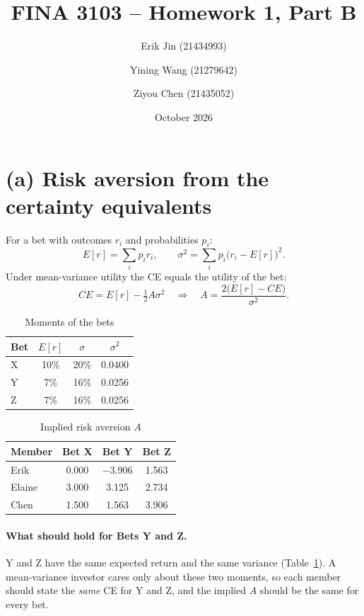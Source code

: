 \documentclass[11pt]{article}
\title{FINA 3103 -- Homework 1, Part B}
\author{Erik Jin (21434993) \and Yining Wang (21279642) \and Ziyou Chen (21435052)}
\date{October 2026}
\begin{document}
\maketitle

\section*{(a) Risk aversion from the certainty equivalents}

For a bet with outcomes $r_i$ and probabilities $p_i$:
\[
E[r] = \sum_i p_i r_i, \qquad
\sigma^2 = \sum_i p_i\bigl(r_i - E[r]\bigr)^2.
\]
Under mean-variance utility the CE equals the utility of the bet:
\[
CE = E[r] - \tfrac12 A\sigma^2
\quad\Longrightarrow\quad
A = \frac{2\bigl(E[r] - CE\bigr)}{\sigma^2}.
\]

\begin{table}[H]
\centering
\caption{Moments of the bets}\label{tab:moments}
\begin{tabular}{lccc}
\toprule
Bet & $E[r]$ & $\sigma$ & $\sigma^2$ \\
\midrule
X & 10\% & 20\% & 0.0400 \\
Y & 7\%  & 16\% & 0.0256 \\
Z & 7\%  & 16\% & 0.0256 \\
\bottomrule
\end{tabular}
\end{table}

\begin{table}[H]
\centering
\caption{Implied risk aversion $A$}\label{tab:A}
\begin{tabular}{lccc}
\toprule
Member & Bet X & Bet Y & Bet Z \\
\midrule
Erik   & 0.000 & $-3.906$ & 1.563 \\
Elaine & 3.000 & 3.125    & 2.734 \\
Chen   & 1.500 & 1.563    & 3.906 \\
\bottomrule
\end{tabular}
\end{table}

\paragraph{What should hold for Bets Y and Z.}
Y and Z have the same expected return and the same variance (Table~\ref{tab:moments}). A mean-variance investor cares only about these two moments, so each member should state the \emph{same} CE for Y and Z, and the implied $A$ should be the same for every bet.
\end{document}
